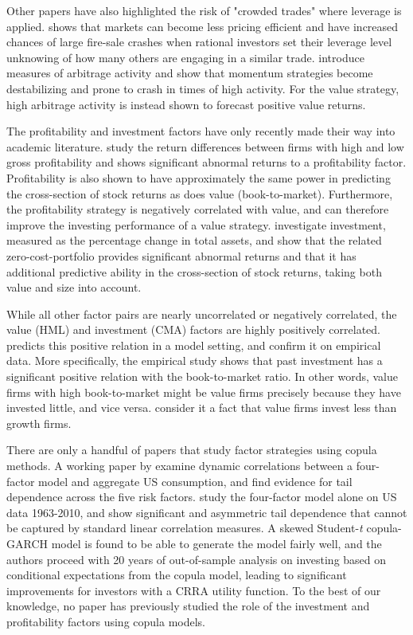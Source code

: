Other papers have also highlighted the risk of "crowded trades" where leverage is applied. \textcite{Stein2009} shows that markets can become less pricing efficient and have increased chances of large fire-sale crashes when rational investors set their leverage level unknowing of how many others are engaging in a similar trade. \textcite{LouPolk2013} introduce measures of arbitrage activity and show that momentum strategies become destabilizing and prone to crash in times of high activity. For the value strategy, high arbitrage activity is instead shown to forecast positive value returns. 

The profitability and investment factors have only recently made their way into academic literature. \textcite{NovyMarx2013} study the return differences between firms with high and low gross profitability and shows significant abnormal returns to a profitability factor. Profitability is also shown to have approximately the same power in predicting the cross-section of stock returns as does value (book-to-market). Furthermore, the profitability strategy is negatively correlated with value, and can therefore improve the investing performance of a value strategy. \textcite{CooperGulenSchill2008} investigate investment, measured as the percentage change in total assets, and show that the related zero-cost-portfolio provides significant abnormal returns and that it has additional predictive ability in the cross-section of stock returns, taking both value and size into account.

While all other factor pairs are nearly uncorrelated or negatively correlated, the value (HML) and investment (CMA) factors are highly positively correlated. \textcite{Zhang2005} predicts this positive relation in a model setting, and \textcite{AndersonGarciaFeijoo2006} confirm it on empirical data. More specifically, the empirical study shows that past investment has a significant positive relation with the book-to-market ratio. In other words, value firms with high book-to-market might be value firms precisely because they have invested little, and vice versa. \textcite{FF2015} consider it a fact that value firms invest less than growth firms.

There are only a handful of papers that study factor strategies using copula methods. A working paper by \textcite{CholleteNing2012} examine dynamic correlations between a four-factor model and aggregate US consumption, and find evidence for tail dependence across the five risk factors. \textcite{ChristoffersenLanglois2013} study the four-factor model alone on US data 1963-2010, and show significant and asymmetric tail dependence that cannot be captured by standard linear correlation measures. A skewed Student-\textit{t} copula-GARCH model is found to be able to generate the model fairly well, and the authors proceed with 20 years of out-of-sample analysis on investing based on conditional expectations from the copula model, leading to significant improvements for investors with a CRRA utility function. To the best of our knowledge, no paper has previously studied the role of the investment and profitability factors using copula models.